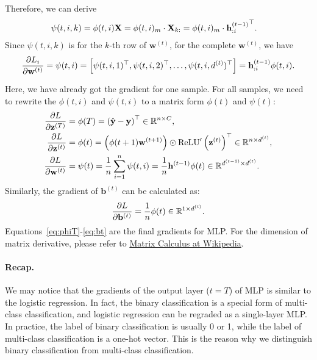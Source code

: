 \documentclass{article}
\begin{document}
Therefore, we can derive
\begin{align}
    \psi(t, i, k) &= \phi(t, i)\mathbf{X} = \phi(t, i)_m \cdot \mathbf{X}_{k:} = \phi(t, i)_m \cdot {\mathbf{h}^{(t - 1)}_{:i}}^\top. \notag
\end{align}
Since $\psi(t, i, k)$ is for the $k$-th row of $\mathbf{w}^{(t)}$, for the complete $\mathbf{w}^{(t)}$, we have
\begin{align}
    \frac{\partial L_{i}}{\partial{\mathbf{w}^{(t)}}} = \psi(t, i) = \left[\psi(t, i, 1)^\top, \psi(t, i, 2)^\top, \dots, \psi(t, i, d^{(t)})^\top\right] = \mathbf{h}^{(t - 1)}_{:i}\phi(t, i). \notag
\end{align}

Here, we have already got the gradient for one sample. For all samples, we need to rewrite the $\phi(t, i)$ and $\psi(t, i)$ to a matrix form $\phi(t)$ and $\psi(t)$:
\begin{align}
    \frac{\partial L}{\partial\mathbf{z}^{(T)}} &= \phi(T) = \left(\hat{\mathbf{y}} - \mathbf{y}\right)^\top \in \mathbb{R}^{n \times C}, \label{eq:phiT} \\
    \frac{\partial L}{\partial\mathbf{z}^{(t)}} &= \phi(t) = \left(\phi(t + 1)\mathbf{w}^{(t + 1)}\right) \odot \text{ReLU}'\left(\mathbf{z}^{(t)}\right)^\top \label{eq:phit} \in \mathbb{R}^{n \times d^{(t)}}, \\
    \frac{\partial L}{\partial\mathbf{w}^{(t)}} &= \psi(t) = \frac{1}{n}\sum_{i = 1}^{n}{\psi(t, i)} = \frac{1}{n}\mathbf{h}^{(t - 1)}\phi(t) \in \mathbb{R}^{d^{(t - 1)} \times d^{(t)}}. \label{eq:psit}
\end{align}
Similarly, the gradient of $\mathbf{b}^{(t)}$ can be calculated as:
\begin{align}
    \frac{\partial L}{\partial\mathbf{b}^{(t)}} = \frac{1}{n}\phi(t) \in \mathbb{R}^{1 \times d^{(t)}}. \label{eq:bt}
\end{align}
Equations~\eqref{eq:phiT}-\eqref{eq:bt} are the final gradients for MLP. For the dimension of matrix derivative, please refer to \href{https://en.wikipedia.org/wiki/Matrix_calculus}{Matrix Calculus at Wikipedia}.

\paragraph{Recap.} We may notice that the gradients of the output layer ($t = T$) of MLP is similar to the logistic regression. In fact, the binary classification is a special form of multi-class classification, and logistic regression can be regraded as a single-layer MLP. In practice, the label of binary classification is usually 0 or 1, while the label of multi-class classification is a one-hot vector. This is the reason why we distinguish binary classification from multi-class classification.
\end{document}
